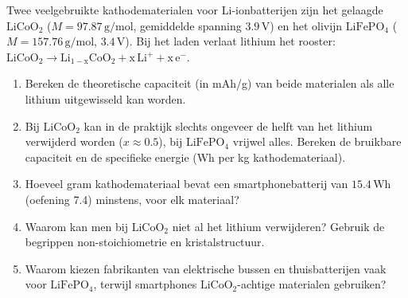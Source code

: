 \begin{oefening}
Twee veelgebruikte kathodematerialen voor Li-ionbatterijen zijn het gelaagde \(\mathrm{LiCoO_2}\) (\(M = 97.87\,\mathrm{g/mol}\), gemiddelde spanning \(3.9\,\mathrm{V}\)) en het olivijn \(\mathrm{LiFePO_4}\) (\(M = 157.76\,\mathrm{g/mol}\), \(3.4\,\mathrm{V}\)). Bij het laden verlaat lithium het rooster: \(\mathrm{LiCoO_2 \rightarrow Li_{1-x}CoO_2 + x\,Li^+ + x\,e^-}\).

\begin{enumerate}
\item[(a)]
  Bereken de theoretische capaciteit (in mAh/g) van beide materialen als alle lithium uitgewisseld kan worden.
\item[(b)]
  Bij \(\mathrm{LiCoO_2}\) kan in de praktijk slechts ongeveer de helft van het lithium verwijderd worden (\(x \approx 0.5\)), bij \(\mathrm{LiFePO_4}\) vrijwel alles. Bereken de bruikbare capaciteit en de specifieke energie (Wh per kg kathodemateriaal).
\item[(c)]
  Hoeveel gram kathodemateriaal bevat een smartphonebatterij van \(15.4\,\mathrm{Wh}\) (oefening 7.4) minstens, voor elk materiaal?
\item[(d)]
  Waarom kan men bij \(\mathrm{LiCoO_2}\) niet al het lithium verwijderen? Gebruik de begrippen non-stoichiometrie en kristalstructuur.
\item[(e)]
  Waarom kiezen fabrikanten van elektrische bussen en thuisbatterijen vaak voor \(\mathrm{LiFePO_4}\), terwijl smartphones \(\mathrm{LiCoO_2}\)-achtige materialen gebruiken?
\end{enumerate}
\end{oefening}
